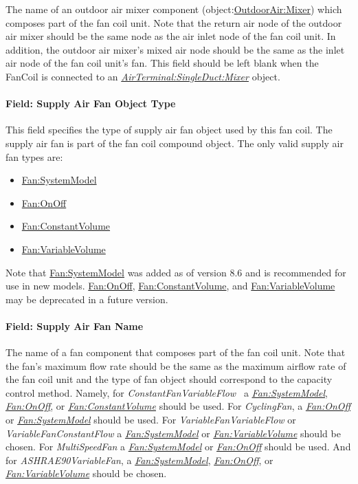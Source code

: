 The name of an outdoor air mixer component (object:\hyperref[outdoorairmixer]{OutdoorAir:Mixer}) which composes part of the fan coil unit. Note that the return air node of the outdoor air mixer should be the same node as the air inlet node of the fan coil unit. In addition, the outdoor air mixer's mixed air node should be the same as the inlet air node of the fan coil unit's fan. This field should be left blank when the FanCoil is connected to an \textit{\hyperref[airterminalsingleductmixer]{AirTerminal:SingleDuct:Mixer}} object.

\paragraph{Field: Supply Air Fan Object Type}\label{field-supply-air-fan-object-type-000}

This field specifies the type of supply air fan object used by this fan coil. The supply air fan is part of the fan coil compound object. The only valid supply air fan types are:

\begin{itemize}
\item
  \hyperref[fansystemmodel]{Fan:SystemModel}
\item
  \hyperref[fanonoff]{Fan:OnOff}
\item
  \hyperref[fanconstantvolume]{Fan:ConstantVolume}
\item
  \hyperref[fanvariablevolume]{Fan:VariableVolume}
\end{itemize}

Note that \hyperref[fansystemmodel]{Fan:SystemModel} was added as of version 8.6 and is recommended for use in new models.  \hyperref[fanonoff]{Fan:OnOff}, \hyperref[fanconstantvolume]{Fan:ConstantVolume}, and \hyperref[fanvariablevolume]{Fan:VariableVolume} may be deprecated in a future version.

\paragraph{Field: Supply Air Fan Name}\label{field-supply-air-fan-name-000}

The name of a fan component that composes part of the fan coil unit. Note that the fan's maximum flow rate should be the same as the maximum airflow rate of the fan coil unit and the type of fan object should correspond to the capacity control method. Namely, for \emph{ConstantFanVariableFlow~} a \emph{\hyperref[fansystemmodel]{Fan:SystemModel}}, \emph{\hyperref[fanonoff]{Fan:OnOff}}, or \emph{\hyperref[fanconstantvolume]{Fan:ConstantVolume}} should be used. For \emph{CyclingFan}, a \emph{\hyperref[fanonoff]{Fan:OnOff}} or \emph{\hyperref[fansystemmodel]{Fan:SystemModel}} should be used. For \emph{VariableFanVariableFlow} or \emph{VariableFanConstantFlow} a \emph{\hyperref[fansystemmodel]{Fan:SystemModel}} or \emph{\hyperref[fanvariablevolume]{Fan:VariableVolume}} should be chosen. For \emph{MultiSpeedFan} a \emph{\hyperref[fansystemmodel]{Fan:SystemModel}} or \emph{\hyperref[fanonoff]{Fan:OnOff}} should be used. And for \emph{ASHRAE90VariableFan}, a \emph{\hyperref[fansystemmodel]{Fan:SystemModel}}, \emph{\hyperref[fanonoff]{Fan:OnOff}}, or \emph{\hyperref[fanvariablevolume]{Fan:VariableVolume}} should be chosen.

